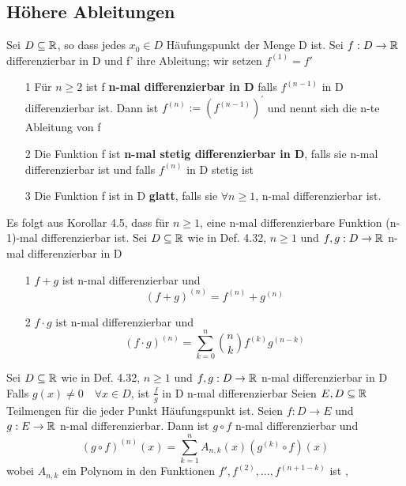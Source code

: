 \subsection{Höhere Ableitungen}
 Sei \(D \subseteq \mathbb{R} \), so dass jedes \(x_0 \in D \) Häufungspunkt der Menge D ist. Sei \(f : D \rightarrow \mathbb{R} \) differenzierbar in D und f' ihre Ableitung; wir setzen \(f^{(1)} = f'\)
\begin{enumerate}
    \item [1] Für \(n \geq 2\) ist f \textbf{n-mal differenzierbar in D} falls \(f^{(n-1)}\) in D differenzierbar ist. Dann ist \( f^{(n)} := (f^{(n-1)})^{'}\) und nennt sich die n-te Ableitung von f
    \item [2] Die Funktion f ist \textbf{n-mal stetig differenzierbar in D}, falls sie n-mal differenzierbar ist und falls \( f^{(n)}\) in D stetig ist
    \item [3] Die Funktion f ist in D \textbf{glatt}, falls sie \( \forall n \geq 1\), n-mal differenzierbar ist. 
\end{enumerate}
 Es folgt aus Korollar 4.5, dass für \(n \geq 1\), eine n-mal differenzierbare Funktion (n-1)-mal differenzierbar ist.
 Sei \( D \subseteq \mathbb{R} \) wie in Def. 4.32, \(n \geq 1\) und \( f,g : D \rightarrow \mathbb{R} \) n-mal differenzierbar in D
\begin{enumerate}
    \item [1] \(f+g\) ist n-mal differenzierbar und
    \[(f+g)^{(n)} = f^{(n)} + g^{(n)}\]
    \item [2] \(f \cdot g\) ist n-mal differenzierbar und
    \[(f \cdot g)^{(n)} = \sum_{k=0}^{n} \binom{n}{k} f^{(k)}g^{(n-k)}\]
\end{enumerate}
 Sei \( D \subseteq \mathbb{R} \) wie in Def. 4.32, \( n \geq 1 \) und \(f, g: D \rightarrow \mathbb{R}\) n-mal differenzierbar in D
Falls \(g(x) \neq 0 \quad \forall x \in D\), ist \(\frac{f}{g}\) in D n-mal differenzierbar
 Seien \(E,D \subseteq \mathbb{R} \) Teilmengen für die jeder Punkt Häufungspunkt ist. Seien \(f:D \rightarrow E\) und \(g: E \rightarrow \mathbb{R} \) n-mal differenzierbar. Dann ist \( g \circ f\) n-mal differenzierbar und
\[(g \circ f)^{(n)}(x) = \sum_{k=1}^n A_{n,k}(x) (g^{(k)} \circ f) (x)\]
wobei \( A_{n,k}\) ein Polynom in den Funktionen \( f', f^{(2)}, \dots , f^{(n+1-k)}\) ist
\sep
